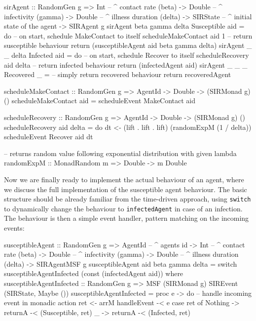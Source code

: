 \begin{HaskellCode}
sirAgent :: RandomGen g 
         => Int         -- ^ contact rate (beta)
         -> Double      -- ^ infectivity (gamma)
         -> Double      -- ^ illness duration (delta)
         -> SIRState    -- ^ initial state of the agent
         -> SIRAgent g
sirAgent beta gamma delta Susceptible aid = do
  -- on start, schedule MakeContact to itself
  scheduleMakeContact aid 1
  -- return susceptible behaviour
  return (susceptibleAgent aid beta gamma delta)
sirAgent _ _ delta Infected aid = do
  -- on start, schedule Recover to itself
  scheduleRecovery aid delta
  -- return infected behaviour
  return (infectedAgent aid)
sirAgent _ _ _ Recovered _ = 
  -- simply return recovered behaviour
  return recoveredAgent

scheduleMakeContact :: RandomGen g => AgentId -> Double -> (SIRMonad g) ()
scheduleMakeContact aid = scheduleEvent MakeContact aid

scheduleRecovery :: RandomGen g => AgentId -> Double -> (SIRMonad g) ()
scheduleRecovery aid delta = do
  dt <- (lift . lift . lift) (randomExpM (1 / delta))
  scheduleEvent Recover aid dt

-- returns random value following exponential distribution with given lambda
randomExpM :: MonadRandom m => Double -> m Double
\end{HaskellCode}

Now we are finally ready to implement the actual behaviour of an agent, where we discuss the full implementation of the susceptible agent behaviour. The basic structure should be already familiar from the time-driven approach, using \texttt{switch} to dynamically change the behaviour to \texttt{infectedAgent} in case of an infection. The behaviour is then a simple event handler, pattern matching on the incoming events:

\begin{HaskellCode}
susceptibleAgent :: RandomGen g 
                 => AgentId        -- ^ agents id
                 -> Int            -- ^ contact rate (beta)
                 -> Double         -- ^ infectivity (gamma)
                 -> Double         -- ^ illness duration (delta)
                 -> SIRAgentMSF g
susceptibleAgent aid beta gamma delta = 
    switch susceptibleAgentInfected (const (infectedAgent aid))
  where
    susceptibleAgentInfected :: RandomGen g 
                             => MSF (SIRMonad g) SIREvent (SIRState, Maybe ()) 
    susceptibleAgentInfected = proc e -> do
      -- handle incoming event in monadic action
      ret <- arrM handleEvent -< e
      case ret of
        Nothing -> returnA -< (Susceptible, ret)
        _       -> returnA -< (Infected, ret)
\end{HaskellCode}

